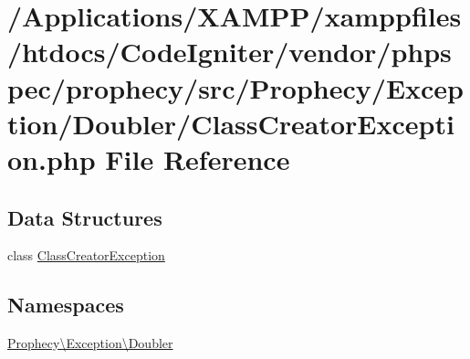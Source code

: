 \hypertarget{_class_creator_exception_8php}{}\section{/\+Applications/\+X\+A\+M\+P\+P/xamppfiles/htdocs/\+Code\+Igniter/vendor/phpspec/prophecy/src/\+Prophecy/\+Exception/\+Doubler/\+Class\+Creator\+Exception.php File Reference}
\label{_class_creator_exception_8php}
\subsection*{Data Structures}
\begin{DoxyCompactItemize}
\item 
class \mbox{\hyperlink{class_prophecy_1_1_exception_1_1_doubler_1_1_class_creator_exception}{Class\+Creator\+Exception}}
\end{DoxyCompactItemize}
\subsection*{Namespaces}
\begin{DoxyCompactItemize}
\item 
 \mbox{\hyperlink{namespace_prophecy_1_1_exception_1_1_doubler}{Prophecy\textbackslash{}\+Exception\textbackslash{}\+Doubler}}
\end{DoxyCompactItemize}
